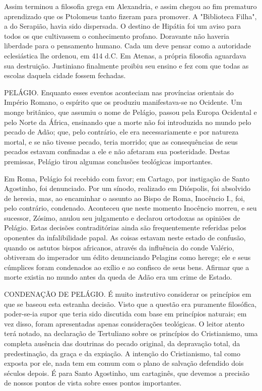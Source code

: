 \documentclass[11pt,a5paper,twoside,openany]{book}
\begin{document}
Assim terminou a filosofia grega em Alexandria, e assim chegou ao fim prematuro aprendizado que os Ptolomeus tanto fizeram para promover. A "Biblioteca Filha", a do Serapião, havia sido dispersada. O destino de Hipátia foi um aviso para todos os que cultivassem o conhecimento profano. Doravante não haveria liberdade para o pensamento humano. Cada um deve pensar como a autoridade eclesiástica lhe ordenou, em 414 d.C. Em Atenas, a própria filosofia aguardava sua destruição. Justiniano finalmente proibiu seu ensino e fez com que todas as escolas daquela cidade fossem fechadas.

PELÁGIO. Enquanto esses eventos aconteciam nas províncias orientais do Império Romano, o espírito que os produziu manifestava-se no Ocidente. Um monge britânico, que assumiu o nome de Pelágio, passou pela Europa Ocidental e pelo Norte da África, ensinando que a morte não foi introduzida no mundo pelo pecado de Adão; que, pelo contrário, ele era necessariamente e por natureza mortal, e se não tivesse pecado, teria morrido; que as consequências de seus pecados estavam confinadas a ele e não afetaram sua posteridade. Destas premissas, Pelágio tirou algumas conclusões teológicas importantes.

Em Roma, Pelágio foi recebido com favor; em Cartago, por instigação de Santo Agostinho, foi denunciado. Por um sínodo, realizado em Dióspolis, foi absolvido de heresia, mas, ao encaminhar o assunto ao Bispo de Roma, Inocêncio I., foi, pelo contrário, condenado. Aconteceu que neste momento Inocêncio morreu, e seu sucessor, Zósimo, anulou seu julgamento e declarou ortodoxas as opiniões de Pelágio. Estas decisões contraditórias ainda são frequentemente referidas pelos oponentes da infalibilidade papal. As coisas estavam neste estado de confusão, quando os astutos bispos africanos, através da influência do conde Valério, obtiveram do imperador um édito denunciando Pelagins como herege; ele e seus cúmplices foram condenados ao exílio e ao confisco de seus bens. Afirmar que a morte existia no mundo antes da queda de Adão era um crime de Estado.

CONDENAÇÃO DE PELÁGIO. É muito instrutivo considerar os princípios em que se baseou esta estranha decisão. Visto que a questão era puramente filosófica, poder-se-ia supor que teria sido discutida com base em princípios naturais; em vez disso, foram apresentadas apenas considerações teológicas. O leitor atento terá notado, na declaração de Tertuliano sobre os princípios do Cristianismo, uma completa ausência das doutrinas do pecado original, da depravação total, da predestinação, da graça e da expiação. A intenção do Cristianismo, tal como exposta por ele, nada tem em comum com o plano de salvação defendido dois séculos depois. É para Santo Agostinho, um cartaginês, que devemos a precisão de nossos pontos de vista sobre esses pontos importantes.
\end{document}
